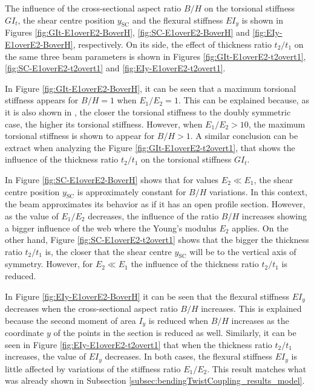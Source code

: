     The influence of the cross-sectional aspect ratio $B/H$ on the torsional stiffness $G I_t$, the shear centre position $y_{\mathrm{SC}}$ and the flexural stiffness $E I_y$ is shown in Figures \ref{fig:GIt-E1overE2-BoverH}, \ref{fig:SC-E1overE2-BoverH} and \ref{fig:EIy-E1overE2-BoverH}, respectively. On its side, the effect of thickness ratio $t_2/t_1$ on the same three beam parameters is shown in Figures \ref{fig:GIt-E1overE2-t2overt1}, \ref{fig:SC-E1overE2-t2overt1} and \ref{fig:EIy-E1overE2-t2overt1}.

    In Figure \ref{fig:GIt-E1overE2-BoverH}, it can be seen that a maximum torsional stiffness appears for $B/H = 1$ when $E_1/E_2 = 1$. This can be explained because, as it is also shown in \cite{Raither2013a}, the closer the torsional stiffness to the doubly symmetric case, the higher its torsional stiffness. However, when $E_1/E_2 > 10$, the maximum torsional stiffness is shown to appear for $B/H > 1$. A similar conclusion can be extract when analyzing the Figure \ref{fig:GIt-E1overE2-t2overt1}, that shows the influence of the thickness ratio $t_2/t_1$ on the torsional stiffness $G I_t$.

    In Figure \ref{fig:SC-E1overE2-BoverH} shows that for values $E_2 \ll E_1$, the shear centre position $y_{\mathrm{SC}}$ is approximately constant for $B/H$ variations. In this context, the beam approximates its behavior as if it has an open profile section. However, as the value of $E_1/E_2$ decreases, the influence of the ratio $B/H$ increases showing a bigger influence of the web where the Young's modulus $E_2$ applies. On the other hand, Figure \ref{fig:SC-E1overE2-t2overt1} shows that the bigger the thickness ratio $t_2/t_1$ is, the closer that the shear centre $y_{\mathrm{SC}}$ will be to the vertical axis of symmetry. However, for $E_2 \ll E_1$ the influence of the thickness ratio $t_2/t_1$ is reduced.

    In Figure \ref{fig:EIy-E1overE2-BoverH} it can be seen that the flexural stiffness $E I_y$ decreases when the cross-sectional aspect ratio $B/H$ increases. This is explained because the second moment of area $I_y$ is reduced when $B/H$ increases as the coordinate $y$ of the points in the section is reduced as well. Similarly, it can be seen in Figure \ref{fig:EIy-E1overE2-t2overt1} that when the thickness ratio $t_2/t_1$ increases, the value of $E I_y$ decreases. In both cases, the flexural stiffness $E I_y$ is little affected by variations of the stiffness ratio $E_1/E_2$. This result matches what was already shown in Subsection \ref{subsec:bendingTwistCoupling_results_model}.

